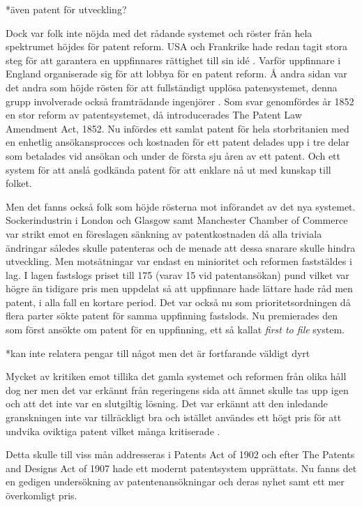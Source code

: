 *även patent för utveckling? 

Dock var folk inte nöjda med det rådande systemet och röster från hela spektrumet höjdes för patent reform. USA och Frankrike hade redan tagit stora steg för att garantera en uppfinnares rättighet till sin idé \cite{macleod}. Varför uppfinnare i England organiserade sig för att lobbya för en patent reform\cite{dutton}. Å andra sidan var det andra som höjde rösten för att fullständigt upplösa patensystemet, denna grupp involverade också framträdande ingenjörer \cite{macleod}.  
Som svar genomfördes år 1852 en stor reform av patentsystemet, då introducerades The Patent Law Amendment Act, 1852. Nu infördes ett samlat patent för hela storbritanien med en enhetlig ansökansprocces och kostnaden för ett patent delades upp i tre delar som betalades vid ansökan och under de första sju åren av ett patent. Och ett system för att anslå godkända patent för att enklare nå ut med kunskap till folket\cite{dutton}.

Men det fanns också folk som höjde rösterna mot införandet av det nya systemet. Sockerindustrin i London och Glasgow samt Manchester Chamber of Commerce var strikt emot en föreslagen sänkning av patentkostnaden då alla triviala ändringar således skulle patenteras och de menade att dessa snarare skulle hindra utveckling\cite{dutton}. Men motsätningar var endast en minioritet och reformen faststäldes i lag. I lagen fastslogs priset till 175 (varav 15 vid patentansökan) pund vilket var högre än tidigare pris men uppdelat så att uppfinnare hade lättare hade råd men patent, i alla fall en kortare period\cite{dutton}. Det var också nu som prioritetsordningen då flera parter sökte patent för samma uppfinning fastslods. Nu premierades den som först ansökte om patent för en uppfinning, ett så kallat \emph{first to file} system\cite{webster}.

*kan inte relatera pengar till något men det är fortfarande väldigt dyrt

Mycket av kritiken emot tillika det gamla systemet och reformen från olika håll dog ner men det var erkännt från regeringens sida att ämnet skulle tas upp igen och att det inte var en slutgiltig lösning\cite{dutton}. Det var erkännt att den inledande granskningen inte var tillräckligt bra och istället användes ett högt pris för att undvika oviktiga patent vilket många kritiserade \cite{dutton}.

Detta skulle till viss mån addresseras i Patents Act of 1902 och efter The Patents 
and Designs Act of 1907 hade ett modernt patentsystem upprättats. Nu fanns det en gedigen undersökning av patentenansökningar och deras nyhet samt ett mer överkomligt pris\cite{macleod}.

